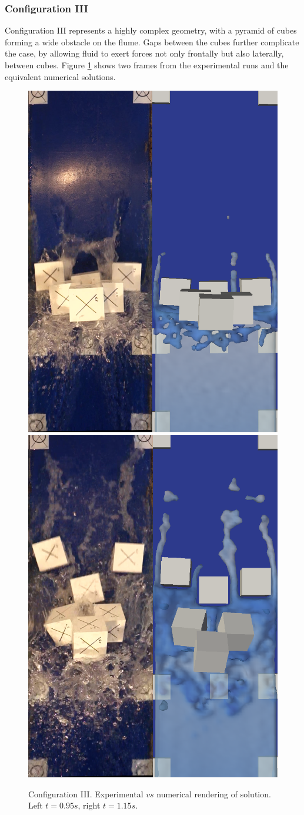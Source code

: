 \subsubsection{Configuration III}
\label{Subsect:config_III}

Configuration III represents a highly complex geometry, with a pyramid of cubes forming a wide obstacle on the flume. Gaps between the cubes further complicate the case, by allowing fluid to exert forces not only frontally but also laterally, between cubes. Figure \ref{fig:figs_D2_IV} shows two frames from the experimental runs and the equivalent numerical solutions.
%
\begin{figure}[ht!]
	\centering 
	\includegraphics[width=0.35\linewidth]{Figures/5.Chapter/Fig_7a}
	\includegraphics[width=0.35\linewidth]{Figures/5.Chapter/Fig_7b}	
	\caption{Configuration III. Experimental $vs$ numerical rendering of solution. Left $t=0.95s$, right $t=1.15s$.}
	\label{fig:figs_D2_IV} 
\end{figure}
%

